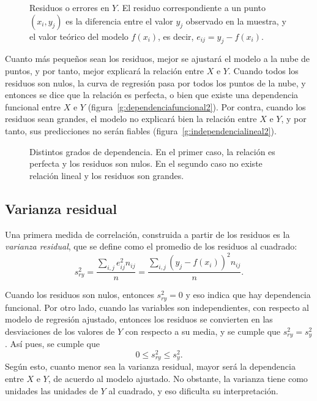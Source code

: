 \begin{figure}[h!]
  \centering
  \scalebox{0.8}{}
  \caption{Residuos o errores en $Y$. El residuo correspondiente a un punto $(x_i,y_j)$
  es la diferencia entre el valor $y_j$ observado en la muestra, y el valor
  teórico del modelo $f(x_i)$, es decir, $e_{ij}=y_j-f(x_i)$.}\label{g:residuos2}
\end{figure}

Cuanto más pequeños sean los residuos, mejor se ajustará el modelo a la nube
de puntos, y por tanto, mejor explicará la relación entre $X$ e $Y$. Cuando
todos los residuos son nulos, la curva de regresión pasa por todos los puntos
de la nube, y entonces se dice que la relación es perfecta, o bien que existe
una dependencia funcional entre $X$ e $Y$ (figura~\ref{g:dependenciafuncional2}).
Por contra, cuando los residuos sean grandes, el modelo no explicará bien la
relación entre $X$ e $Y$, y por tanto, sus predicciones no serán fiables
(figura~\ref{g:independencialineal2}).

\begin{figure}[h!]
\centering {}\qquad
{}
\caption{Distintos grados de dependencia. En el primer caso, la relación es
perfecta y los residuos son nulos. En el segundo caso no existe relación
lineal y los residuos son grandes.}
\end{figure}

\subsection{Varianza residual}
Una primera medida de correlación, construida a partir de los residuos es la
\emph{varianza residual}, que se define como el promedio de los residuos al
cuadrado:
\[
s^2_{ry}=\frac{\sum_{i,j} e_{ij}^2 n_{ij}}{n}= \frac{\sum_{i,j} (y_j-f(x_i))^2
n_{ij}}{n}.
\]

Cuando los residuos son nulos, entonces $s^2_{ry}=0$ y eso indica que hay
dependencia funcional. Por otro lado, cuando las variables son independientes,
con respecto al modelo de regresión ajustado, entonces los residuos se
convierten en las desviaciones de los valores de $Y$ con respecto a su media, y se cumple
que $s^2_{ry}=s_y^2$. Así pues, se cumple que
\[  0 \leq s^2_{ry}\leq s_y^2. \]
Según esto, cuanto menor sea la varianza residual, mayor será la dependencia
entre $X$ e $Y$, de acuerdo al modelo ajustado. No obstante, la varianza tiene
como unidades las unidades de $Y$ al cuadrado, y eso dificulta su
interpretación.

